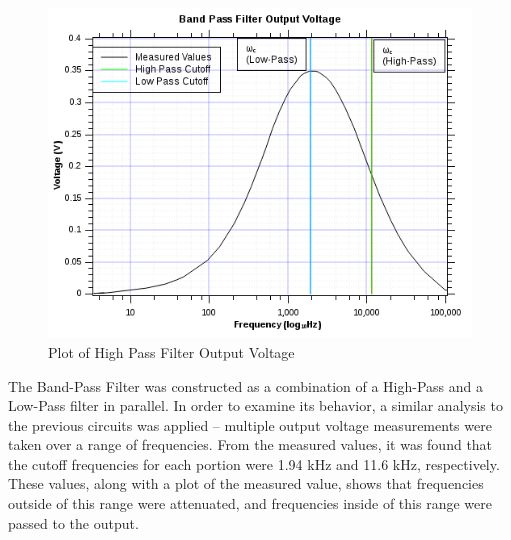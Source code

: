 \documentclass[twocolumn,english]{IEEEtran}
\theoremstyle{plain}
\theoremstyle{plain}
\begin{document}
	\begin{figure}[H]
			\begin{centering}
			\begin{center}
			\includegraphics[width=\linewidth]{./Graphs/BandPass.png}
			\caption{Plot of High Pass Filter Output Voltage}
			\label{graph:hp_output}
			\end{center}
			\par\end{centering}
		\end{figure}
		The Band-Pass Filter was constructed as a combination of a High-Pass and a Low-Pass filter in parallel. In order to examine its behavior, a similar analysis to the previous circuits was applied -- multiple output voltage measurements were taken over a range of frequencies. From the measured values, it was found that the cutoff frequencies for each portion were 1.94 kHz and 11.6 kHz, respectively. These values, along with a plot of the measured value, shows that frequencies outside of this range were attenuated, and frequencies inside of this range were passed to the output.


\onecolumn
\appendices{}
\end{document}
